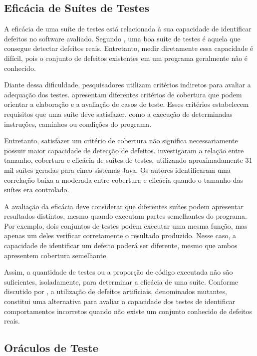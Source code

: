 \subsection{Eficácia de Suítes de Testes}

A eficácia de uma suíte de testes está relacionada à sua capacidade de identificar defeitos no software avaliado. Segundo , uma boa suíte de testes é aquela que consegue detectar defeitos reais. Entretanto, medir diretamente essa capacidade é difícil, pois o conjunto de defeitos existentes em um programa geralmente não é conhecido.

Diante dessa dificuldade, pesquisadores utilizam critérios indiretos para avaliar a adequação dos testes.  apresentam diferentes critérios de cobertura que podem orientar a elaboração e a avaliação de casos de teste. Esses critérios estabelecem requisitos que uma suíte deve satisfazer, como a execução de determinadas instruções, caminhos ou condições do programa.

Entretanto, satisfazer um critério de cobertura não significa necessariamente possuir maior capacidade de detecção de defeitos.  investigaram a relação entre tamanho, cobertura e eficácia de suítes de testes, utilizando aproximadamente 31 mil suítes geradas para cinco sistemas Java. Os autores identificaram uma correlação baixa a moderada entre cobertura e eficácia quando o tamanho das suítes era controlado.

A avaliação da eficácia deve considerar que diferentes suítes podem apresentar resultados distintos, mesmo quando executam partes semelhantes do programa. Por exemplo, dois conjuntos de testes podem executar uma mesma função, mas apenas um deles verificar corretamente o resultado produzido. Nesse caso, a capacidade de identificar um defeito poderá ser diferente, mesmo que ambos apresentem cobertura semelhante.

Assim, a quantidade de testes ou a proporção de código executada não são suficientes, isoladamente, para determinar a eficácia de uma suíte. Conforme discutido por , a utilização de defeitos artificiais, denominados mutantes, constitui uma alternativa para avaliar a capacidade dos testes de identificar comportamentos incorretos quando não existe um conjunto conhecido de defeitos reais.

\subsection{Oráculos de Teste}

